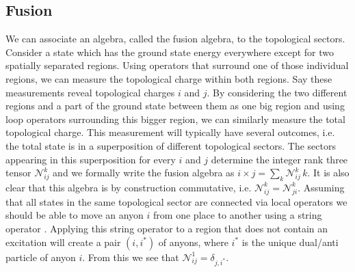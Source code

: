 \documentclass[12 pt]{article}
\begin{document}
\subsection{Fusion} \label{sec:fusion}

We can associate an algebra, called the fusion algebra, to the topological sectors. Consider a state which has the ground state energy everywhere except for two spatially separated regions. Using operators that surround one of those individual regions, we can measure the topological charge within both regions. Say these measurements reveal topological charges $i$ and $j$. By considering the two different regions and a part of the ground state between them as one big region and using loop operators surrounding this bigger region, we can similarly measure the total topological charge. This measurement will typically have several outcomes, i.e. the total state is in a superposition of different topological sectors. The sectors appearing in this superposition for every $i$ and $j$ determine the integer rank three tensor $\mathscr{N}_{ij}^k$ and we formally write the fusion algebra as $i\times j = \sum_{k}\mathscr{N}_{ij}^k\,k$. It is also clear that this algebra is by construction commutative, i.e. $\mathscr{N}_{ij}^k = \mathscr{N}_{ji}^k$. Assuming that all states in the same topological sector are connected via local operators we should be able to move an anyon $i$ from one place to another using a string operator \cite{ReadChakraborty,Kitaev03,Kitaev06,LevinWen05}. Applying this string operator to a region that does not contain an excitation will create a pair $(i,i^*)$ of anyons, where $i^*$ is the unique dual/anti particle of anyon $i$. From this we see that $\mathscr{N}_{ij}^1 = \delta_{j,i^*}$.
\end{document}

